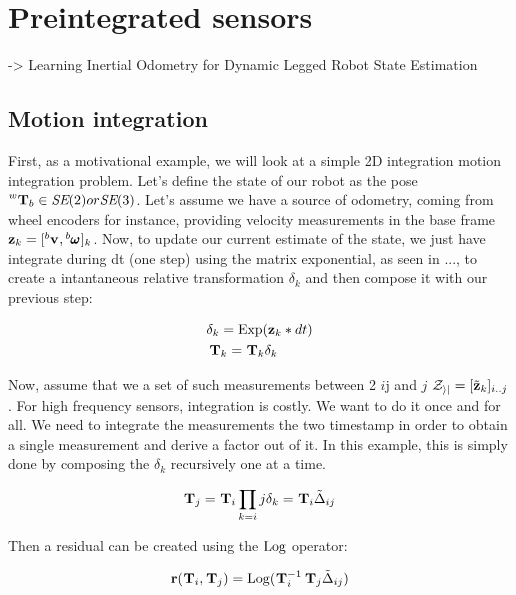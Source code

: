 \chapter{Preintegrated sensors}
\minitoc

\cite{buchanan2021learning} -> Learning Inertial Odometry for Dynamic Legged Robot State Estimation


\section{Motion integration}
First, as a motivational example, we will look at a simple 2D integration motion integration problem. 
Let's define the state of our robot as the pose $\prescript{w}{}{{\bf T}}_{b} \in \textit{SE} (2) or \textit{SE}(3)$. 
Let's assume we have a source of odometry, coming from wheel encoders for instance, providing velocity measurements in the base frame 
${\bf z}_k = [\prescript{b}{}{{\bf v}}_{}, \prescript{b}{}{\pmb{\omega}}_{}]_k$. Now, to update our current estimate of the state, we just have integrate during dt (one step) 
using the matrix exponential, as seen in ..., to create a intantaneous relative transformation $\delta_k$ and then compose it with our previous step:

\begin{equation}
    \begin{split}
        &\delta_k = \operatorname*{Exp}({\bf z}_k * dt) 
        \\
        &\prescript{}{}{{\bf T}}_{k} = \prescript{}{}{{\bf T}}_{k} \delta_k
    \end{split}
\end{equation}

Now, assume that we a set of such measurements between 2 \KFs $i$j and $j$ $\mathcal{Z_{ij}} = [\tilde{{\bf z}}_k]_{i..j}$. 
For high frequency sensors, integration is costly. We want to do it once and for all.
We need to integrate the measurements the two \KFs timestamp in order to obtain a single measurement and derive a factor out of it.
In this example, this is simply done by composing the $\delta_k$ recursively one at a time.

\begin{equation}
    \prescript{}{}{{\bf T}}_{j} = \prescript{}{}{{\bf T}}_{i} \prod_{k=i}{j}\delta_k = \prescript{}{}{{\bf T}}_{i} \tilde\Delta_{ij}
\end{equation}

Then a residual can be created using the $\operatorname*{Log}$ operator:

\begin{equation}
    {\bf r}(\prescript{}{}{{\bf T}}_{i}, \prescript{}{}{{\bf T}}_{j}) = \operatorname*{Log}(\prescript{}{}{{\bf T}}_{i}^{-1}\prescript{}{}{{\bf T}}_{j} \tilde\Delta_{ij})
\end{equation}

